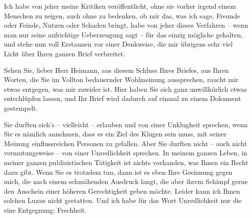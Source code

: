 \pstart
           Ich habe von jeher meine Kritiken veröffentlicht, ohne sie vorher irgend einem
               Menschen zu zeigen, auch ohne zu bedenken, ob mir das, was ich sage, Freunde oder
               Feinde, Nutzen oder Schaden bringt, habe von jeher dieses Verfahren – wenn man nur
               seine aufrichtige Ueberzeugung sagt – für das einzig mögliche gehalten, und stehe nun
               voll Erstaunen vor einer Denkweise, die mir übrigens sehr viel Licht über Ihren
               ganzen Brief verbreitet.\pend
           
\pstart
           Sehen Sie, lieber Herr Heimann, aus diesem
               Schluss Ihres Briefes, aus Ihren Worten, die Sie im Vollton bedauernder Wohlmeinung
               aussprechen, raucht mir etwas entgegen, was mir zuwider ist. Hier haben Sie sich ganz unwillkürlich etwas
               entschlüpfen lassen, und Ihr Brief wird dadurch auf einmal zu einem Dokument
               gestempelt.\pend
           
\pstart
           Sie durften sich’s – vielleicht – erlauben und von einer Unklugheit sprechen, wenn
               Sie es nämlich annehmen, dass es ein Ziel des Klugen sein muss, mit seiner Meinung
               einflussreichen Personen zu gefallen. Aber Sie durften nicht – auch nicht
               vermutungsweise – von einer Unredlichkeit sprechen. In meinem ganzen Leben, in mei{\pb}ner ganzen publizistischen
               Tätigkeit ist nichts vorhanden, was Ihnen ein Recht dazu gibt. Wenn Sie es trotzdem
               tun, dann ist es eben Ihre Gesinnung gegen mich, die nach einem schmähenden Ausdruck
               langt, die aber ihrem Schimpf gerne den Anschein einer höheren Gerechtigkeit geben
               möchte. Leider kann ich Ihnen solchen Luxus nicht gestatten. Und ich habe für das
               Wort Unredlichkeit nur die eine Entgegnung: Frechheit.\pend
           
